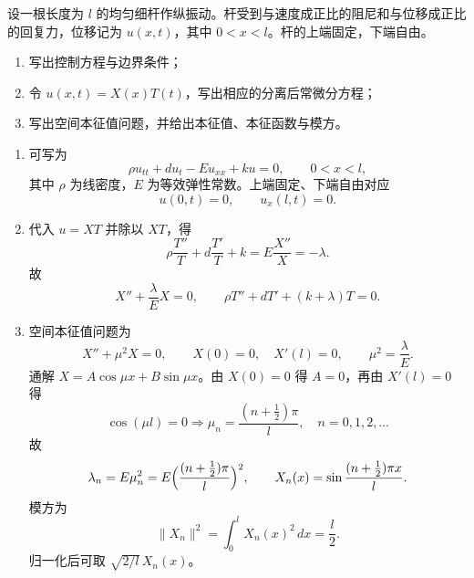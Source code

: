 ﻿


\begin{question}
设一根长度为 $l$ 的均匀细杆作纵振动。杆受到与速度成正比的阻尼和与位移成正比的回复力，位移记为 $u(x,t)$，其中 $0<x<l$。杆的上端固定，下端自由。
\begin{enumerate}[label=（\arabic*）,leftmargin=2.8em,itemsep=0.2em]
\item 写出控制方程与边界条件；
\item 令 $u(x,t)=X(x)T(t)$，写出相应的分离后常微分方程；
\item 写出空间本征值问题，并给出本征值、本征函数与模方。
\end{enumerate}
\begin{solution}

\begin{enumerate}[label=（\arabic*）,leftmargin=2.8em,itemsep=0.2em]
\item 可写为
\[
\rho u_{tt}+d u_t-Eu_{xx}+ku=0,
\qquad 0<x<l,
\]
其中 $\rho$ 为线密度，$E$ 为等效弹性常数。上端固定、下端自由对应
\[
 u(0,t)=0,\qquad u_x(l,t)=0.
\]
\item 代入 $u=XT$ 并除以 $XT$，得
\[
\rho \frac{T''}{T}+d\frac{T'}{T}+k=E\frac{X''}{X}=-\lambda.
\]
故
\[
X''+\frac{\lambda}{E}X=0,
\qquad
\rho T''+dT'+(k+\lambda)T=0.
\]
\item 空间本征值问题为
\[
X''+\mu^2X=0,
\qquad X(0)=0,\quad X'(l)=0,
\qquad \mu^2=\frac{\lambda}{E}.
\]
通解 $X=A\cos\mu x+B\sin\mu x$。由 $X(0)=0$ 得 $A=0$，再由 $X'(l)=0$ 得
\[
\cos(\mu l)=0\Longrightarrow \mu_n=\frac{(n+\tfrac12)\pi}{l},\quad n=0,1,2,\dots
\]
故
\[
\lambda_n=E\mu_n^2=E\Bigl(\frac{(n+\tfrac12)\pi}{l}\Bigr)^2,
\qquad X_n(x)=\sin\frac{(n+\tfrac12)\pi x}{l}.
\]
模方为
\[
\|X_n\|^2=\int_0^l X_n(x)^2\,dx=\frac l2.
\]
归一化后可取 $\sqrt{2/l}\,X_n(x)$。
\end{enumerate}

\end{solution}
\end{question}

